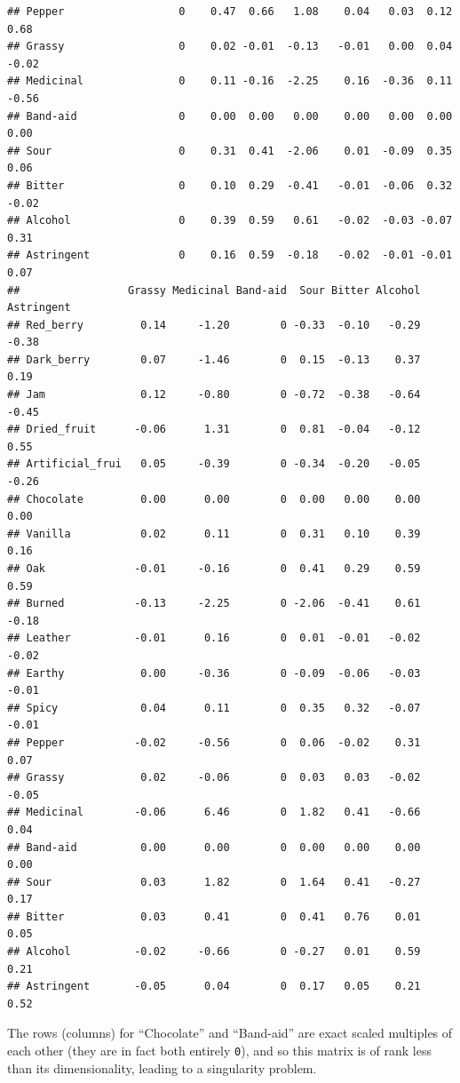 \documentclass[
]{book}
\begin{document}
\begin{verbatim}
## Pepper                  0    0.47  0.66   1.08    0.04   0.03  0.12   0.68
## Grassy                  0    0.02 -0.01  -0.13   -0.01   0.00  0.04  -0.02
## Medicinal               0    0.11 -0.16  -2.25    0.16  -0.36  0.11  -0.56
## Band-aid                0    0.00  0.00   0.00    0.00   0.00  0.00   0.00
## Sour                    0    0.31  0.41  -2.06    0.01  -0.09  0.35   0.06
## Bitter                  0    0.10  0.29  -0.41   -0.01  -0.06  0.32  -0.02
## Alcohol                 0    0.39  0.59   0.61   -0.02  -0.03 -0.07   0.31
## Astringent              0    0.16  0.59  -0.18   -0.02  -0.01 -0.01   0.07
##                 Grassy Medicinal Band-aid  Sour Bitter Alcohol Astringent
## Red_berry         0.14     -1.20        0 -0.33  -0.10   -0.29      -0.38
## Dark_berry        0.07     -1.46        0  0.15  -0.13    0.37       0.19
## Jam               0.12     -0.80        0 -0.72  -0.38   -0.64      -0.45
## Dried_fruit      -0.06      1.31        0  0.81  -0.04   -0.12       0.55
## Artificial_frui   0.05     -0.39        0 -0.34  -0.20   -0.05      -0.26
## Chocolate         0.00      0.00        0  0.00   0.00    0.00       0.00
## Vanilla           0.02      0.11        0  0.31   0.10    0.39       0.16
## Oak              -0.01     -0.16        0  0.41   0.29    0.59       0.59
## Burned           -0.13     -2.25        0 -2.06  -0.41    0.61      -0.18
## Leather          -0.01      0.16        0  0.01  -0.01   -0.02      -0.02
## Earthy            0.00     -0.36        0 -0.09  -0.06   -0.03      -0.01
## Spicy             0.04      0.11        0  0.35   0.32   -0.07      -0.01
## Pepper           -0.02     -0.56        0  0.06  -0.02    0.31       0.07
## Grassy            0.02     -0.06        0  0.03   0.03   -0.02      -0.05
## Medicinal        -0.06      6.46        0  1.82   0.41   -0.66       0.04
## Band-aid          0.00      0.00        0  0.00   0.00    0.00       0.00
## Sour              0.03      1.82        0  1.64   0.41   -0.27       0.17
## Bitter            0.03      0.41        0  0.41   0.76    0.01       0.05
## Alcohol          -0.02     -0.66        0 -0.27   0.01    0.59       0.21
## Astringent       -0.05      0.04        0  0.17   0.05    0.21       0.52
\end{verbatim}

The rows (columns) for ``Chocolate'' and ``Band-aid'' are exact scaled multiples of each other (they are in fact both entirely \texttt{0}), and so this matrix is of rank less than its dimensionality, leading to a singularity problem.
\end{document}
